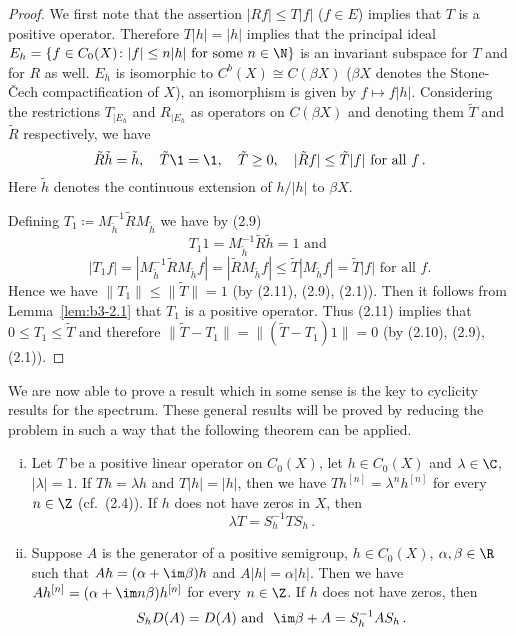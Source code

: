 \begin{proof}
	We first note that the assertion $|Rf| \leq T|f|$ ($f \in E$) implies that $T$ is a positive operator.
	Therefore $T|h| = |h|$ implies that the principal ideal $E_{h} = \{f \in C_{0}(X) \colon |f| \leq n|h| \text{ for some } n \in \N\}$ is an invariant subspace for $T$ and for $R$ as well.
	$E_{h}$ is isomorphic to $C^{b}(X) \cong C(\beta X)$ ($\beta X$ denotes the Stone-Čech compactification of $X$), an isomorphism is given by $f \mapsto f|h|$.
	Considering the restrictions $T_{|E_{h}}$ and $R_{|E_{h}}$ as operators on $C(\beta X)$ and denoting them $\tilde{T}$ and $\tilde{R}$ respectively, we have
\begin{equation}\label{eq:b3-2.9}
		\tilde{R}\tilde{h} = \tilde{h}, \quad \tilde{T}\1 = \1, \quad \tilde{T} \geq 0, \quad |\tilde{R}f| \leq \tilde{T}|f| \text{ for all } f\,.
	\end{equation}
%
	Here $\tilde{h}$ denotes the continuous extension of $h/|h|$ to $\beta X$.
	
	Defining $T_{1} \coloneqq M_{\tilde{h}}^{-1}\tilde{R}M_{\tilde{h}}$ we have by (2.9)
	\begin{equation}\label{eq:b3-2.10}
	T_{1}1 = M_{\tilde{h}}^{-1}\tilde{R}\tilde{h} = 1 \text{ and }
	\end{equation}
	\begin{equation}\label{eq:b3-2.11}
	|T_{1}f| = |M_{\tilde{h}}^{-1}\tilde{R}M_{\tilde{h}}f| = |\tilde{R}M_{\tilde{h}}f| \leq \tilde{T}|M_{\tilde{h}}f| = \tilde{T}|f| \text{ for all } f.
	\end{equation}
	Hence we have $\|T_{1}\| \leq \|\tilde{T}\| = 1$ (by (2.11), (2.9), (2.1)).
	Then it follows from Lemma~\ref{lem:b3-2.1} that $T_{1}$ is a positive operator.
	Thus (2.11) implies that $0 \leq T_{1} \leq \tilde{T}$ and therefore $\|\tilde{T} - T_{1}\| = \|(\tilde{T} - T_{1})1\| = 0$ (by (2.10), (2.9), (2.1)).
\end{proof}
We are now able to prove a result which in some sense is the key to cyclicity results for the spectrum.
	These general results will be proved by reducing the problem in such a way that the following theorem can be applied.
\begin{theorem}\label{thm:b3-2.4}
\begin{enumerate}[(i)]	
\item
Let $T$ be a positive linear operator on $C_{0}(X)$, let $h \in C_{0}(X)$ and $\lambda \in \C$, $|\lambda| = 1$.
	If $Th = \lambda h$ and $T|h| = |h|$, then we have $Th^{[n]} = \lambda^{n}h^{[n]}$ for every $n \in \Z$ (cf.\ (2.4)).
	If $h$ does not have zeros in $X$, then 
	\[
	\lambda T = S_{h}^{-1}TS_{h}\,.
	\]
\item
Suppose $A$ is the generator of a positive semigroup, $h \in C_{0}(X)$, $\alpha,\beta \in \R$ such that $Ah = (\alpha+\im\beta )h$ and $A|h| = \alpha|h|$. 
	Then we have $Ah^{[n]} = (\alpha+\im n\beta)h^{[n]}$ for every $n \in \Z$.
	If $h$ does not have zeros, then 
	\[
	S_{h}D(A) = D(A) \text{ and \ } \im\beta + A = S_{h}^{-1}AS_{h}\,.
	\]
\end{enumerate}
\end{theorem}
